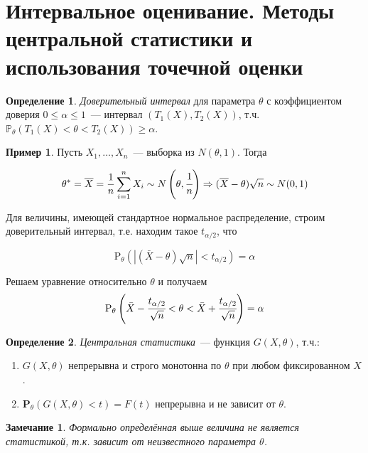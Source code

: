 \documentclass[oneside,final,14pt]{extreport}
\newtheorem*{rmrk}{Замечание}
\theoremstyle{definition}
\newtheorem{defn}{Определение}[section]
\newtheorem*{exmp}{Пример}
\begin{document}
\section{Интервальное оценивание. Методы центральной статистики и использования точечной оценки}

\begin{defn}
{\it Доверительный интервал} для параметра \(\theta\) с коэффициентом доверия \(0 \leq \alpha \leq 1\)~--- интервал \((T_1(X), T_2(X))\), т.ч. \(\mathbb{P}_{\theta}(T_1(X) < \theta < T_2(X)) \geq \alpha\).
\end{defn}

\begin{exmp}
Пусть \(X_1, \ldots, X_n\)~--- выборка из \(N(\theta, 1)\). Тогда

\begin{equation*}
    \theta^{*}=\overline{X}=\frac{1}{n} \sum_{i=1}^{n} X_{i} \sim N\left(\theta, \cfrac{1}{n}\right) \Rightarrow (\overline{X}-\theta) \sqrt{n} \sim N(0,1)
\end{equation*}

Для величины, имеющей стандартное нормальное распределение, строим доверительный интервал, т.е. находим такое \(t_{\alpha / 2} \), что 

\begin{equation*}
    \mathrm{P}_{\theta}\left(|(\bar{X}-\theta) \sqrt{n}|<t_{\alpha / 2}\right)=\alpha
\end{equation*}

Решаем уравнение относительно \(\theta\) и получаем
\begin{equation*}
    \mathrm{P}_{\theta}\left(\bar{X}-\cfrac{t_{\alpha / 2}}{\sqrt{n}}<\theta<\bar{X}+\cfrac{t_{\alpha / 2}}{\sqrt{n}}\right)=\alpha 
\end{equation*}

\end{exmp}

\begin{defn}
{\it Центральная статистика}~--- функция \(G(X,\theta)\), т.ч.:
\begin{enumerate}
    \item \(G(X,\theta)\) непрерывна и строго монотонна по \(\theta\) при любом фиксированном \(X\).
    \item \(\mathbf{P}_{\theta}(G(X, \theta)<t)=F(t)\) непрерывна и не зависит от \(\theta\).
\end{enumerate}
\end{defn}

\begin{rmrk}
Формально определённая выше величина не является статистикой, т.к. зависит от неизвестного параметра \(\theta\).
\end{rmrk}
\end{document}
